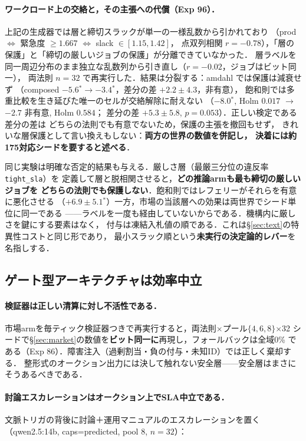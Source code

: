 \documentclass[uplatex,twocolumn,fontsize=9pt,paper=a4]{jlreq}
\newcommand{\sig}{$^{*}$}
\begin{document}
\paragraph{ワークロード上の交絡と，その主張への代償（Exp 96）．}
上記の生成器では層と締切スラックが単一の一様乱数から引かれており
（prod $\Leftrightarrow$ 緊急度 $\ge 1.667$ $\Leftrightarrow$ slack $\in[1.15,1.42]$，
点双列相関 $r=-0.78$），「層の保護」と「締切の厳しいジョブの保護」が分離できていなかった．
層ラベルを同一周辺分布のまま独立な乱数列から引き直し（$r=-0.02$，ジョブはビット同一），
両法則 $n=32$ で再実行した．結果は分裂する：amdahl では保護は減衰せず
（composed $-5.6$\sig $\rightarrow -3.4$\sig，差分の差 $+2.2\pm4.3$，非有意），
飽和則では多重比較を生き延びた唯一のセルが交絡解除に耐えない
（$-8.0$\sig, Holm $0.017$ $\rightarrow$ $-2.7$ 非有意, Holm $0.584$；
差分の差 $+5.3\pm5.8$, $p=0.053$）．正しい検定である差分の差は
どちらの法則でも有意でないため，保護の主張を撤回もせず，
きれいな層保護として言い換えもしない：\textbf{両方の世界の数値を併記し，
決着には約175対応シードを要すると述べる}．

同じ実験は明確な否定的結果も与える．厳しさ層（最厳三分位の違反率 \texttt{tight\_sla}）を
定義して層と脱相関させると，\textbf{どの推論armも最も締切の厳しいジョブを
どちらの法則でも保護しない}．飽和則ではレフェリーがそれらを有意に悪化させる
（$+6.9\pm5.1$\sig）一方，市場の当該層への効果は両世界でシード単位に同一である
——ラベルを一度も経由していないからである．機構内に厳しさを鍵にする要素はなく，
付与は凍結入札値の順である．これは\S\ref{sec:text}の特異性コストと同じ形であり，
最小スラック順という\textbf{未実行の決定論的レバー}を名指しする．

\subsection{ゲート型アーキテクチャは効率中立}\label{sec:gated}
\paragraph{検証器は正しい清算に対し不活性である．}
市場armを毎ティック検証器つきで再実行すると，両法則$\times$プール$\{4,6,8\}$$\times$32
シードで\S\ref{sec:market}の数値を\textbf{ビット同一に}再現し，フォールバックは全域0\%
である（Exp 86）．障害注入（過剰割当・負の付与・未知ID）では正しく棄却する．
整形式のオークション出力には決して触れない安全層——安全層はまさにそうあるべきである．

\paragraph{討論エスカレーションはオークション上でSLA中立である．}
文脈トリガの背後に討論＋運用マニュアルのエスカレーションを置く
（qwen2.5:14b, caps=predicted, pool 8, $n=32$）：
\end{document}
